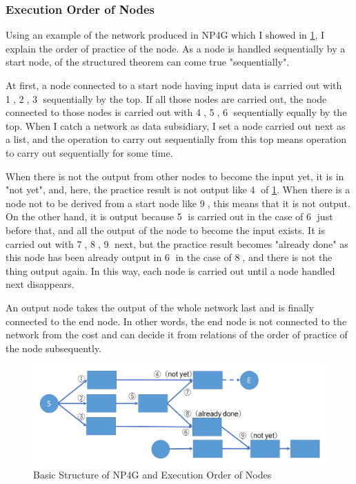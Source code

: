 \documentclass{article}
\begin{document}
\subsubsection {Execution Order of Nodes}
\label{sec:sequence}
Using an example of the network produced in NP4G which I showed in \ref{fig:sequence}, I explain the order of practice of the node.
As a node is handled sequentially by a start node, of the structured theorem can come true "sequentially".

At first, a node connected to a start node having input data is carried out with \textcircled{\scriptsize 1}, \textcircled{\scriptsize 2}, \textcircled{\scriptsize 3} sequentially by the top.
If all those nodes are carried out, the node connected to those nodes is carried out with \textcircled{\scriptsize 4}, \textcircled{\scriptsize 5}, \textcircled{\scriptsize 6} sequentially equally by the top.
When I catch a network as data subsidiary, I set a node carried out next as a list, and the operation to carry out sequentially from this top means operation to carry out sequentially for some time.

When there is not the output from other nodes to become the input yet, it is in "not yet", and, here, the practice result is not output like \textcircled{\scriptsize 4} of \ref{fig:sequence}.
When there is a node not to be derived from a start node like \textcircled{\scriptsize 9}, this means that it is not output.
On the other hand, it is output because \textcircled{\scriptsize 5} is carried out in the case of \textcircled{\scriptsize 6} just before that, and all the output of the node to become the input exists.
It is carried out with \textcircled{\scriptsize 7}, \textcircled{\scriptsize 8}, \textcircled{\scriptsize 9} next, but the practice result becomes "already done" as this node has been already output in \textcircled{\scriptsize 6} in the case of \textcircled{\scriptsize 8}, and there is not the thing output again.
In this way, each node is carried out until a node handled next disappears.

An output node takes the output of the whole network last and is finally connected to the end node.
In other words, the end node is not connected to the network from the cost and can decide it from relations of the order of practice of the node subsequently.

\begin{figure}[t]
\begin{center}
\includegraphics[width=130mm]{sequence.png}
\end{center}
\caption{Basic Structure of NP4G and Execution Order of Nodes}
\label{fig:sequence}
\end{figure}
\end{document}
